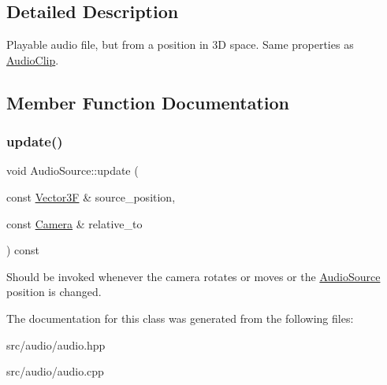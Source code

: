 \subsection{Detailed Description}
Playable audio file, but from a position in 3D space. Same properties as \mbox{\hyperlink{class_audio_clip}{Audio\+Clip}}. 

\subsection{Member Function Documentation}
\mbox{\label{class_audio_source_acc045186f5f7516c3b71598f0b65b0c5}} 
\subsubsection{\texorpdfstring{update()}{update()}}
{\footnotesize\ttfamily void Audio\+Source\+::update (\begin{DoxyParamCaption}\item[{const \mbox{\hyperlink{class_vector3}{Vector3F}} \&}]{source\+\_\+position,  }\item[{const \mbox{\hyperlink{class_camera}{Camera}} \&}]{relative\+\_\+to }\end{DoxyParamCaption}) const}

Should be invoked whenever the camera rotates or moves or the \mbox{\hyperlink{class_audio_source}{Audio\+Source}} position is changed. 

The documentation for this class was generated from the following files\+:\begin{DoxyCompactItemize}
\item 
src/audio/audio.\+hpp\item 
src/audio/audio.\+cpp\end{DoxyCompactItemize}
